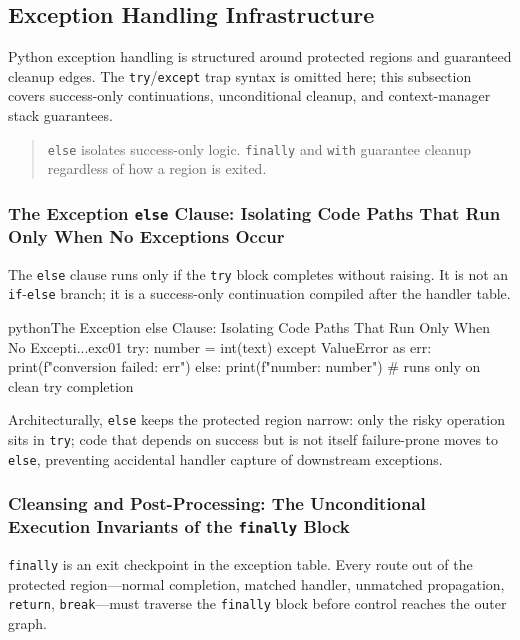 \subsection{Exception Handling Infrastructure}

Python exception handling is structured around protected regions and guaranteed cleanup edges. The \texttt{try}/\texttt{except} trap syntax is omitted here; this subsection covers success-only continuations, unconditional cleanup, and context-manager stack guarantees.

\begin{quote}
\texttt{else} isolates success-only logic. \texttt{finally} and \texttt{with} guarantee cleanup regardless of how a region is exited.
\end{quote}

\subsubsection{The Exception \texttt{else} Clause: Isolating Code Paths That Run Only When No Exceptions Occur}

The \texttt{else} clause runs only if the \texttt{try} block completes without raising. It is not an \texttt{if}-\texttt{else} branch; it is a success-only continuation compiled after the handler table.

\begin{codebox}[]{python}{The Exception else Clause: Isolating Code Paths That Run Only When No Excepti...}{exc01}
try:
    number = int(text)
except ValueError as err:
    print(f"conversion failed: {err}")
else:
    print(f"number: {number}")   # runs only on clean try completion
\end{codebox}


Architecturally, \texttt{else} keeps the protected region narrow: only the risky operation sits in \texttt{try}; code that depends on success but is not itself failure-prone moves to \texttt{else}, preventing accidental handler capture of downstream exceptions.

\subsubsection{Cleansing and Post-Processing: The Unconditional Execution Invariants of the \texttt{finally} Block}

\texttt{finally} is an exit checkpoint in the exception table. Every route out of the protected region---normal completion, matched handler, unmatched propagation, \texttt{return}, \texttt{break}---must traverse the \texttt{finally} block before control reaches the outer graph.

